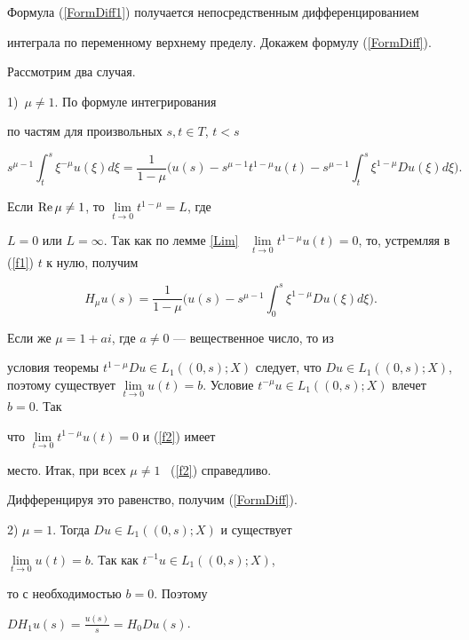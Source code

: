 \begin{pf}


Формула (\ref{FormDiff1}) получается непосредственным дифференцированием


интеграла по переменному верхнему пределу. Докажем формулу (\ref{FormDiff}).


Рассмотрим два случая.





1)~$\mu \ne 1$. По формуле интегрирования


по частям для произвольных $s,t \in T$, $t < s$


\begin{equation}\label{f1}


s^{\mu-1}\int_t^s \xi^{-\mu}u(\xi) d \xi =


\frac{1}{1-\mu}\bigg(u(s)-s^{\mu-1}t^{1-\mu}u(t)-


s^{\mu-1}\int_t^s \xi^{1-\mu}D u(\xi) d \xi\bigg).


\end{equation}


Если $\operatorname{Re} \mu \ne 1$, то $\lim\limits_{t\to 0}t^{1-\mu}=L$, где


$L=0$ или $L=\infty$. Так как по лемме \ref{Lim} \ $\lim\limits_{t\to


0}t^{1-\mu}u(t)=0$, то, устремляя в (\ref{f1}) $t$ к нулю, получим


\begin{equation}\label{f2}


H_\mu u(s)=\frac{1}{1-\mu}\bigg(u(s)-


s^{\mu-1}\int_0^s \xi^{1-\mu}D u(\xi) d \xi\bigg).


\end{equation}


Если же $\mu=1+ a i$, где $a \ne 0$ --- вещественное число, то из


условия теоремы $t^{1-\mu}D u \in L_1((0,s);X)$ следует, что $D u


\in L_1((0,s);X)$, поэтому существует $\lim\limits_{t\to


0}u(t)=b$. Условие $t^{-\mu} u \in L_1((0,s);X)$ влечет $b=0$. Так


что $\lim\limits_{t\to 0}t^{1-\mu}u(t)=0$ и (\ref{f2}) имеет


место. Итак, при всех $\mu \ne 1$ \ (\ref{f2}) справедливо.


Дифференцируя это равенство, получим (\ref{FormDiff}).





2) $\mu=1$. Тогда $D u \in L_1((0,s);X)$ и существует


$\lim\limits_{t\to 0}u(t)=b$. Так как $t^{-1}u \in L_1((0,s);X)$,


то с необходимостью $b=0$. Поэтому


$DH_1u(s)=\frac{u(s)}{s}=H_0 D u(s)$.


\end{pf}





